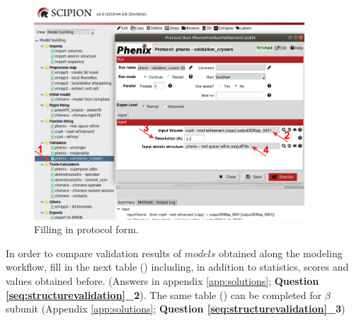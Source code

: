   \begin{figure}[H]
    \centering 
    \captionsetup{width=.7\linewidth} 
    \includegraphics[width=0.90\textwidth]{Images/Fig60}
    \caption{Filling in \phenix \validationCryoEM protocol form.}
    \label{fig:validationCryoEM_protocol}
    \end{figure}
  
  In order to compare validation results of $models$ obtained along the modeling workflow, fill in the next table () including, in addition to \molprobity statistics, \emringer scores and \ccmask values obtained before. (Answers in appendix \ref{app:solutions}; \textbf{Question \ref{seq:structurevalidation}\_2}). The same table () can be completed for  $\beta$ subunit (Appendix \ref{app:solutions}; \textbf{Question \ref{seq:structurevalidation}\_3})\\
  
